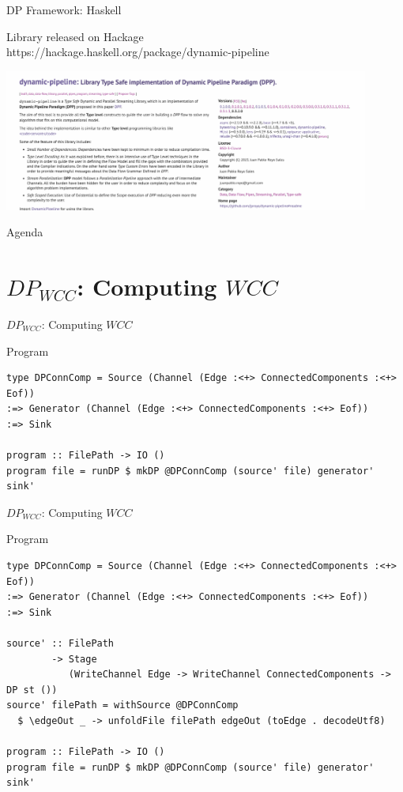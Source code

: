 \documentclass{beamer}
\begin{document}
  \begin{frame}[fragile]{DP Framework: Haskell}
    \begin{block}{}
      Library released on Hackage \\
      https://hackage.haskell.org/package/dynamic-pipeline
      \begin{center}
        \includegraphics[width = 0.9\textwidth, height = 0.6\textheight]{dp-fw-hs}
      \end{center}  
    \end{block}
  \end{frame}

  \begin{frame}{Agenda}
    \section{$DP_{WCC}$: Computing $WCC$}
    \tableofcontents[currentsection]
  \end{frame}

  \begin{frame}[fragile]{$DP_{WCC}$: Computing $WCC$}
    \begin{block}{Program}
      \begin{verbatim}      
type DPConnComp = Source (Channel (Edge :<+> ConnectedComponents :<+> Eof))
:=> Generator (Channel (Edge :<+> ConnectedComponents :<+> Eof))
:=> Sink

program :: FilePath -> IO ()
program file = runDP $ mkDP @DPConnComp (source' file) generator' sink'
      \end{verbatim}
    \end{block}
  \end{frame}


  \begin{frame}[fragile]{$DP_{WCC}$: Computing $WCC$}
    \begin{block}{Program}
      \begin{verbatim}      
type DPConnComp = Source (Channel (Edge :<+> ConnectedComponents :<+> Eof))
:=> Generator (Channel (Edge :<+> ConnectedComponents :<+> Eof))
:=> Sink

source' :: FilePath
        -> Stage
           (WriteChannel Edge -> WriteChannel ConnectedComponents -> DP st ())
source' filePath = withSource @DPConnComp
  $ \edgeOut _ -> unfoldFile filePath edgeOut (toEdge . decodeUtf8)

program :: FilePath -> IO ()
program file = runDP $ mkDP @DPConnComp (source' file) generator' sink'  
      \end{verbatim}
    \end{block}
  \end{frame}
\end{document}
